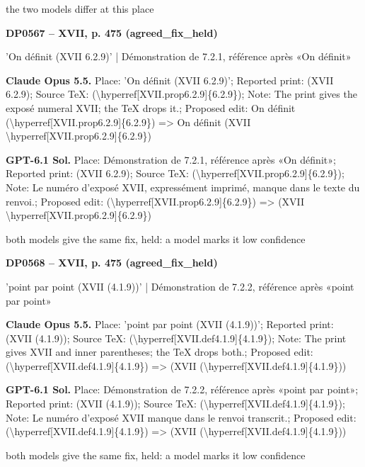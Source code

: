the two models differ at this place\par
\par\noindent\hypertarget{DP0567}{}\textbf{DP0567 -- XVII, p. 475 (agreed\_fix\_held)}\par
'On définit (XVII 6.2.9)' | Démonstration de 7.2.1, référence après «On définit»\par
\textbf{Claude Opus 5.5.} Place: 'On définit (XVII 6.2.9)'; Reported print: (XVII 6.2.9); Source TeX: (\textbackslash{}hyperref[XVII.prop6.2.9]\{6.2.9\}); Note: The print gives the exposé numeral XVII; the TeX drops it.; Proposed edit: On définit (\textbackslash{}hyperref[XVII.prop6.2.9]\{6.2.9\}) =\allowbreak > On définit (XVII \textbackslash{}hyperref[XVII.prop6.2.9]\{6.2.9\})\par
\textbf{GPT-6.1 Sol.} Place: Démonstration de 7.2.1, référence après «On définit»; Reported print: (XVII 6.2.9); Source TeX: (\textbackslash{}hyperref[XVII.prop6.2.9]\{6.2.9\}); Note: Le numéro d'exposé XVII, expressément imprimé, manque dans le texte du renvoi.; Proposed edit: (\textbackslash{}hyperref[XVII.prop6.2.9]\{6.2.9\}) =\allowbreak > (XVII \textbackslash{}hyperref[XVII.prop6.2.9]\{6.2.9\})\par
both models give the same fix, held: a model marks it low confidence\par
\par\noindent\hypertarget{DP0568}{}\textbf{DP0568 -- XVII, p. 475 (agreed\_fix\_held)}\par
'point par point (XVII (4.1.9))' | Démonstration de 7.2.2, référence après «point par point»\par
\textbf{Claude Opus 5.5.} Place: 'point par point (XVII (4.1.9))'; Reported print: (XVII (4.1.9)); Source TeX: (\textbackslash{}hyperref[XVII.def4.1.9]\{4.1.9\}); Note: The print gives XVII and inner parentheses; the TeX drops both.; Proposed edit: (\textbackslash{}hyperref[XVII.def4.1.9]\{4.1.9\}) =\allowbreak > (XVII (\textbackslash{}hyperref[XVII.def4.1.9]\{4.1.9\}))\par
\textbf{GPT-6.1 Sol.} Place: Démonstration de 7.2.2, référence après «point par point»; Reported print: (XVII (4.1.9)); Source TeX: (\textbackslash{}hyperref[XVII.def4.1.9]\{4.1.9\}); Note: Le numéro d'exposé XVII manque dans le renvoi transcrit.; Proposed edit: (\textbackslash{}hyperref[XVII.def4.1.9]\{4.1.9\}) =\allowbreak > (XVII (\textbackslash{}hyperref[XVII.def4.1.9]\{4.1.9\}))\par
both models give the same fix, held: a model marks it low confidence\par
